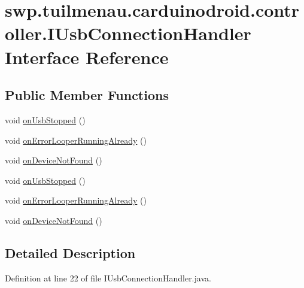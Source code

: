 \hypertarget{interfaceswp_1_1tuilmenau_1_1carduinodroid_1_1controller_1_1_i_usb_connection_handler}{}\section{swp.\+tuilmenau.\+carduinodroid.\+controller.\+I\+Usb\+Connection\+Handler Interface Reference}
\label{interfaceswp_1_1tuilmenau_1_1carduinodroid_1_1controller_1_1_i_usb_connection_handler}
\subsection*{Public Member Functions}
\begin{DoxyCompactItemize}
\item 
void \hyperlink{interfaceswp_1_1tuilmenau_1_1carduinodroid_1_1controller_1_1_i_usb_connection_handler_a1bb25ee474b0c65e5cac68f504e3322b}{on\+Usb\+Stopped} ()
\item 
void \hyperlink{interfaceswp_1_1tuilmenau_1_1carduinodroid_1_1controller_1_1_i_usb_connection_handler_afcaf80567470dce1b025832862b5193a}{on\+Error\+Looper\+Running\+Already} ()
\item 
void \hyperlink{interfaceswp_1_1tuilmenau_1_1carduinodroid_1_1controller_1_1_i_usb_connection_handler_a28256f61b093f0a19946f5f822861225}{on\+Device\+Not\+Found} ()
\item 
void \hyperlink{interfaceswp_1_1tuilmenau_1_1carduinodroid_1_1controller_1_1_i_usb_connection_handler_a1bb25ee474b0c65e5cac68f504e3322b}{on\+Usb\+Stopped} ()
\item 
void \hyperlink{interfaceswp_1_1tuilmenau_1_1carduinodroid_1_1controller_1_1_i_usb_connection_handler_afcaf80567470dce1b025832862b5193a}{on\+Error\+Looper\+Running\+Already} ()
\item 
void \hyperlink{interfaceswp_1_1tuilmenau_1_1carduinodroid_1_1controller_1_1_i_usb_connection_handler_a28256f61b093f0a19946f5f822861225}{on\+Device\+Not\+Found} ()
\end{DoxyCompactItemize}


\subsection{Detailed Description}


Definition at line 22 of file I\+Usb\+Connection\+Handler.\+java.



